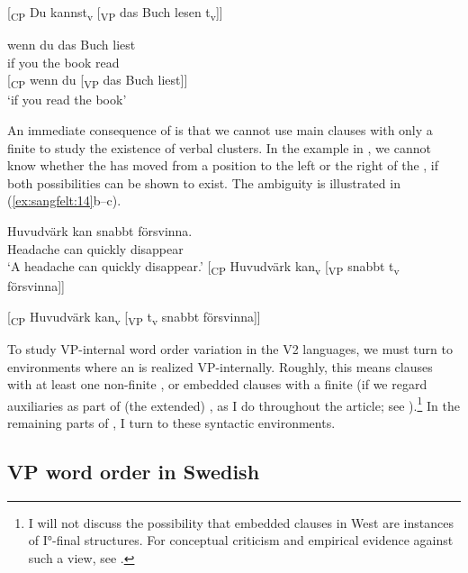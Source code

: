 \documentclass[output=paper, colorlinks, citecolor=brown]{langscibook}
\begin{document}
[\textsubscript{CP} Du kannst\textsubscript{v} [\textsubscript{VP} {das} {Buch} lesen t\textsubscript{v}]]

\ex\label{ex:sangfelt:13b}
\gll wenn du das Buch liest \\
 if you the book read\\

[\textsubscript{CP} wenn du [\textsubscript{VP} {das} {Buch} liest]]\\

\glt ‘if you read the book’
\z 
\z 

An immediate consequence of    is that we cannot use main clauses with only a finite  to study the existence of verbal clusters. In the  example in , we cannot know whether the  has moved from a position to the left or the right of the , if both possibilities can be shown to exist. The ambiguity is illustrated in (\ref{ex:sangfelt:14}b–c).

\ea {}\label{ex:sangfelt:14}
\ea \label{ex:sangfelt:14a}
\gll Huvudvärk kan {snabbt} försvinna.  \\
 Headache can quickly disappear \\
\glt ‘A headache can quickly disappear.’
\ex\label{ex:sangfelt:14b}
[\textsubscript{CP} Huvudvärk kan\textsubscript{v} [\textsubscript{VP} snabbt t\textsubscript{v} försvinna]]

[\textsubscript{CP} Huvudvärk kan\textsubscript{v} [\textsubscript{VP} t\textsubscript{v} snabbt försvinna]]
\z 
\z

To study VP-internal word order variation in the  V2 languages, we must turn to environments where an  is realized VP-internally. Roughly, this means clauses with at least one non-finite , or embedded clauses with a finite  (if we regard auxiliaries as part of (the extended) , as I do throughout the article; see ).\footnote{I will not discuss the possibility that embedded clauses in West  are instances of I°-final structures. For conceptual criticism and empirical evidence against such a view, see \citet[54–68]{Haider2010}.} In the remaining parts of , I turn to these syntactic environments.

\subsection{VP word order in Swedish}\label{sec:sangfelt:3.2}
\end{document}
